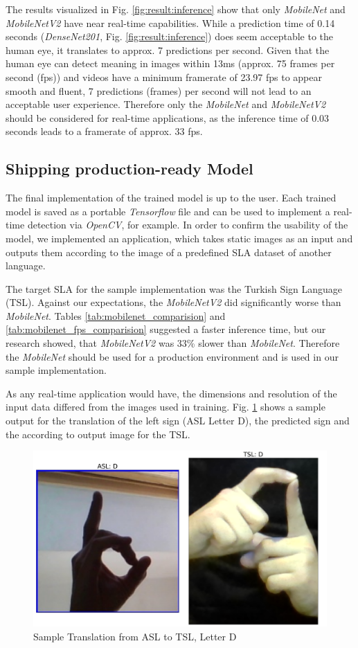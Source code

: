 The results visualized in Fig. \ref{fig:result:inference} show that only \textit{MobileNet} and \textit{MobileNetV2} have near real-time capabilities. While a prediction time of 0.14 seconds (\textit{DenseNet201}, Fig. \ref{fig:result:inference}) does seem acceptable to the human eye, it translates to approx. 7 predictions per second. Given that the human eye can detect meaning in images within 13ms\cite{Potter2014} (approx. 75 frames per second (fps)) and videos have a minimum framerate of 23.97 fps to appear smooth and fluent, 7 predictions (frames) per second will not lead to an acceptable user experience. Therefore only the \textit{MobileNet} and \textit{MobileNetV2} should be considered for real-time applications, as the inference time of 0.03 seconds leads to a framerate of approx. 33 fps.

\subsection{Shipping production-ready Model}
The final implementation of the trained model is up to the user. Each trained model is saved as a portable \textit{Tensorflow} file and can be used to implement a real-time detection via \textit{OpenCV}, for example. In order to confirm the usability of the model, we implemented an application, which takes static images as an input and outputs them according to the image of a predefined SLA dataset of another language. 

The target SLA for the sample implementation was the Turkish Sign Language (TSL). Against our expectations, the \textit{MobileNetV2} did significantly worse than \textit{MobileNet}. Tables \ref{tab:mobilenet_comparision} and \ref{tab:mobilenet_fps_comparision} suggested a faster inference time, but our research showed, that \textit{MobileNetV2} was 33\% slower than \textit{MobileNet}. Therefore the \textit{MobileNet} should be used for a production environment and is used in our sample implementation.

As any real-time application would have, the dimensions and resolution of the input data differed from the images used in training. Fig. \ref{fig:result:translation} shows a sample output for the translation of the left sign (ASL Letter D), the predicted sign and the according to output image for the TSL.

\begin{figure}[h]
    \centering
    \caption{Sample Translation from ASL to TSL, Letter D}
	\label{fig:result:translation}
    \includegraphics[width=\linewidth]{figures/sample_translate_D_tur.png}
\end{figure}